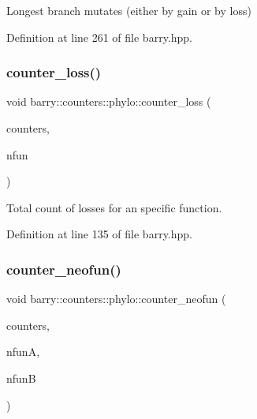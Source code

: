 Longest branch mutates (either by gain or by loss) 



Definition at line 261 of file barry.\+hpp.

\mbox{\label{namespacebarry_1_1counters_1_1phylo_a095c62704de05d78bed1a77a4c5f4311}} 
\subsubsection{\texorpdfstring{counter\+\_\+loss()}{counter\_loss()}}
{\footnotesize\ttfamily void barry\+::counters\+::phylo\+::counter\+\_\+loss (\begin{DoxyParamCaption}\item[{\hyperlink{namespacebarry_1_1counters_1_1phylo_a2f117d1cd1dff67e1539cbc0aef5766a}{Phylo\+Counter\+Vector} $\ast$}]{counters,  }\item[{\hyperlink{namespacebarry_a11dfc53ddb4672278319aa04f1e09a6c}{uint}}]{nfun }\end{DoxyParamCaption})\hspace{0.3cm}{\ttfamily [inline]}}



Total count of losses for an specific function. 



Definition at line 135 of file barry.\+hpp.

\mbox{\label{namespacebarry_1_1counters_1_1phylo_a9a68f426b83f9b7fad0457930b60064c}} 
\subsubsection{\texorpdfstring{counter\+\_\+neofun()}{counter\_neofun()}}
{\footnotesize\ttfamily void barry\+::counters\+::phylo\+::counter\+\_\+neofun (\begin{DoxyParamCaption}\item[{\hyperlink{namespacebarry_1_1counters_1_1phylo_a2f117d1cd1dff67e1539cbc0aef5766a}{Phylo\+Counter\+Vector} $\ast$}]{counters,  }\item[{\hyperlink{namespacebarry_a11dfc53ddb4672278319aa04f1e09a6c}{uint}}]{nfunA,  }\item[{\hyperlink{namespacebarry_a11dfc53ddb4672278319aa04f1e09a6c}{uint}}]{nfunB }\end{DoxyParamCaption})\hspace{0.3cm}{\ttfamily [inline]}}



